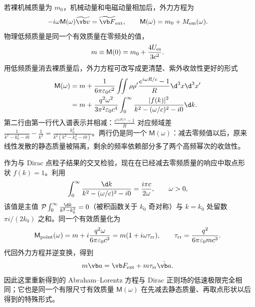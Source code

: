若裸机械质量为 $m_0$，机械动量和电磁动量相加后，外力方程为
\begin{equation*}
 -i\omega\mathsf M(\omega)\widetilde{\vb v}
 =\widetilde{\vb F}_{\mathrm{ext}},
 \qquad
 \mathsf M(\omega)=m_0+M_{\mathrm{em}}(\omega).
\end{equation*}
物理低频质量是同一个有效质量在零频处的值，
\begin{equation*}
 m\equiv\mathsf M(0)
 =m_0+{4U_{\mathrm{es}}\over3c^2}.
\end{equation*}
用低频质量消去裸质量后，外力方程可改写成更清楚、紫外收敛性更好的形式
\begin{align*}
 \mathsf M(\omega)
 &=m+{1\over6\pi\varepsilon_0c^2}
 \iint\rho\rho'
 {e^{i\omega R/c}-1\over R}\d^3x\d^3x'\\
 &=m+{q^2\omega^2\over3\pi^2\varepsilon_0c^4}
 \int_0^\infty
 {|f(k)|^2\over k^2-(\omega/c)^2-i0}\d k.
\end{align*}
第二行由第一行代入谱表示并相减：$\frac{e^{i\omega R/c}-1}{R}$ 对应频域差 $\frac{1}{k^2-k_0^2-i0}-\frac{1}{k^2}=\frac{k_0^2}{k^2(k^2-k_0^2-i0)}$。两行仍是同一个 $\mathsf M(\omega)$：减去零频值以后，原来线性发散的静态质量被隔离，剩余的频率依赖部分多了两个高频幂次的收敛性。

作为与 Dirac 点粒子结果的交叉检验，现在在已经减去零频质量的响应中取点形状 $f(k)=1$。利用
\begin{equation*}
 \int_0^\infty{\d k\over k^2-(\omega/c)^2-i0}
 ={i\pi c\over2\omega},
 \qquad \omega>0,
\end{equation*}
该值是主值 $\mathcal P\int_0^\infty\frac{\d k}{k^2-k_0^2}=0$（被积函数关于 $k_0$ 奇对称）与 $k=k_0$ 处留数 $\pi i/(2k_0)$ 之和。同一个有效质量化为
\begin{equation*}
 \mathsf M_{\mathrm{point}}(\omega)
 =m+i{q^2\omega\over6\pi\varepsilon_0c^3}
 =m(1+i\omega\tau_{\mathrm{rr}}),
 \qquad
 \tau_{\mathrm{rr}}={q^2\over6\pi\varepsilon_0mc^3}.
\end{equation*}
代回外力方程并逆变换，得到
\begin{equation*}
 m\vb a
 =\vb F_{\mathrm{ext}}+m\tau_{\mathrm{rr}}\dot{\vb a}.
\end{equation*}
因此这里重新得到的 Abraham--Lorentz 方程与 Dirac 正则场的低速极限完全相同；它也是同一个有限尺寸有效质量 $\mathsf M(\omega)$ 在先减去静态质量、再取点形状以后得到的特殊形式。

